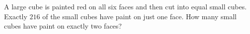 A large cube is painted red on all six faces and then cut into equal small cubes. Exactly $216$ of the small cubes have paint on just one face. How many small cubes have paint on exactly two faces?
